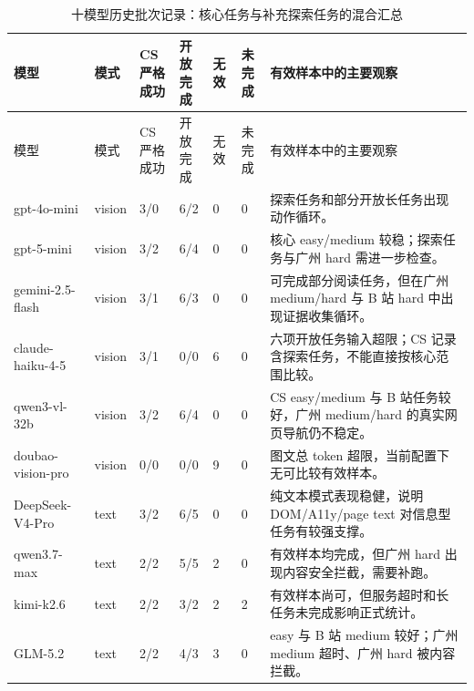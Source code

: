 \begingroup
\small
\renewcommand{\arraystretch}{1.15}
\setlength{\tabcolsep}{4pt}
\begin{longtable}{p{}p{}p{}p{}p{}p{}p{}}
  \caption{十模型历史批次记录：核心任务与补充探索任务的混合汇总}\label{tab:model-valid-results}\\
  \toprule
  模型 & 模式 & \makecell[c]{CS\\严格成功} & \makecell[c]{开放\\完成} & 无效 & \makecell[c]{未\\完成} & 有效样本中的主要观察 \\
  \midrule
  \endfirsthead
  \toprule
  模型 & 模式 & \makecell[c]{CS\\严格成功} & \makecell[c]{开放\\完成} & 无效 & \makecell[c]{未\\完成} & 有效样本中的主要观察 \\
  \midrule
  \endhead
  \bottomrule
  \endfoot
  gpt-4o-mini & vision & 3/0 & 6/2 & 0 & 0 & 探索任务和部分开放长任务出现动作循环。\\
  gpt-5-mini & vision & 3/2 & 6/4 & 0 & 0 & 核心 easy/medium 较稳；探索任务与广州 hard 需进一步检查。\\
  gemini-2.5-flash & vision & 3/1 & 6/3 & 0 & 0 & 可完成部分阅读任务，但在广州 medium/hard 与 B 站 hard 中出现证据收集循环。\\
  claude-haiku-4-5 & vision & 3/1 & 0/0 & 6 & 0 & 六项开放任务输入超限；CS 记录含探索任务，不能直接按核心范围比较。\\
  qwen3-vl-32b & vision & 3/2 & 6/4 & 0 & 0 & CS easy/medium 与 B 站任务较好，广州 medium/hard 的真实网页导航仍不稳定。\\
  doubao-vision-pro & vision & 0/0 & 0/0 & 9 & 0 & 图文总 token 超限，当前配置下无可比较有效样本。\\
  DeepSeek-V4-Pro & text & 3/2 & 6/5 & 0 & 0 & 纯文本模式表现稳健，说明 DOM/A11y/page text 对信息型任务有较强支撑。\\
  qwen3.7-max & text & 2/2 & 5/5 & 2 & 0 & 有效样本均完成，但广州 hard 出现内容安全拦截，需要补跑。\\
  kimi-k2.6 & text & 2/2 & 3/2 & 2 & 2 & 有效样本尚可，但服务超时和长任务未完成影响正式统计。\\
  GLM-5.2 & text & 2/2 & 4/3 & 3 & 0 & easy 与 B 站 medium 较好；广州 medium 超时、广州 hard 被内容拦截。\\
\end{longtable}
\endgroup

